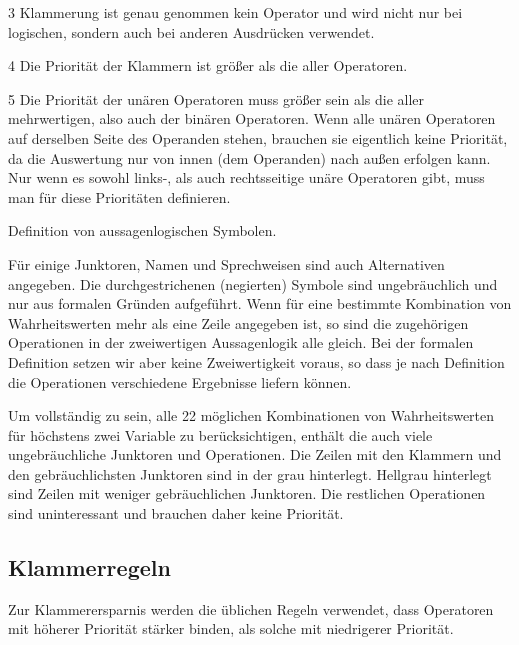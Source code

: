 \begin{table}
\begin{threeparttable}
\begin{tablenotes}
			\item[3] Klammerung ist genau genommen kein Operator und wird nicht nur bei logischen, sondern auch bei anderen Ausdrücken verwendet.
			
			\item[4] Die Priorität der Klammern ist größer als die aller Operatoren.
			
			\item[5] Die Priorität der unären Operatoren muss größer sein als die aller mehrwertigen, also auch der binären Operatoren.
			Wenn alle unären Operatoren auf derselben Seite des Operanden stehen, brauchen sie eigentlich keine Priorität, da die Auswertung nur von innen (dem Operanden) nach außen erfolgen kann.
			Nur wenn es sowohl links-, als auch rechtsseitige unäre Operatoren gibt, muss man für diese Prioritäten definieren.
			
		\end{tablenotes}
		\caption{Definition von aussagenlogischen Symbolen.}
		\label{tab:Symbole}%
	\end{threeparttable}
\end{table}

Für einige Junktoren, Namen und Sprechweisen sind auch Alternativen angegeben.
Die durchgestrichenen (\textdh negierten) Symbole sind ungebräuchlich und nur aus formalen Gründen aufgeführt.
Wenn für eine bestimmte Kombination von Wahrheitswerten mehr als eine Zeile angegeben ist, so sind die zugehörigen Operationen in der zweiwertigen Aussagenlogik alle gleich.
Bei der formalen Definition setzen wir aber keine Zweiwertigkeit voraus, so dass je nach Definition die Operationen verschiedene Ergebnisse liefern können.

Um vollständig zu sein, \textdh alle 22 möglichen Kombinationen von Wahrheitswerten für höchstens zwei Variable zu berücksichtigen, enthält die \tablename{} auch viele ungebräuchliche Junktoren und Operationen.
Die Zeilen mit den Klammern und den gebräuchlichsten Junktoren sind in der \tablename{} grau hinterlegt.
Hellgrau hinterlegt sind Zeilen mit weniger gebräuchlichen Junktoren.
Die restlichen Operationen sind uninteressant und brauchen daher keine Priorität.

\subsection{Klammerregeln}%
\label{sub:Klammerregeln}

Zur Klammerersparnis werden die üblichen Regeln verwendet, \textdh dass Operatoren mit höherer Priorität stärker binden, als solche mit niedrigerer Priorität.

